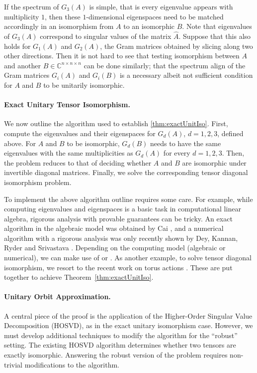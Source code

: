 \documentclass[11pt]{article}
\numberwithin{equation}{section}
\theoremstyle{remark}
\newcommand{\CC}{\mathbb{C}}
\begin{document}
If the spectrum of $G_3(A)$ is simple, that is every eigenvalue appears with multiplicity $1$, then these $1$-dimensional eigenspaces need to be matched accordingly in an isomorphism from $A$ to an isomorphic $B$. Note that eigenvalues of $G_3(A)$ correspond to singular values of the matrix $\hat{A}$. Suppose that this also holds for $G_1(A)$ and $G_2(A)$, the Gram matrices obtained by slicing along two other directions. Then it is not hard to see that testing isomorphism between $A$ and another $B\in \CC^{n\times n\times n}$ can be done similarly; that the spectrum align of the Gram matrices $G_i(A)$ and $G_i(B)$ is a necessary albeit not sufficient condition for $A$ and $B$ to be unitarily isomorphic.

\paragraph{Exact Unitary Tensor Isomorphism.}
We now outline the algorithm used to establish \cref{thm:exactUnitIso}. First, compute the eigenvalues and their eigenspaces for $G_{d}(A)$, $d=1, 2, 3$, defined above. For $A$ and $B$ to be isomorphic, $G_{d}(B)$ needs to have the same eigenvalues with the same multiplicities as $G_{d}(A)$ for every $d=1, 2, 3$. Then, the problem reduces to that of deciding whether $A$ and $B$ are isomorphic under invertible diagonal matrices. Finally, we solve the corresponding tensor diagonal isomorphism problem.

To implement the above algorithm outline requires some care. For example, while computing eigenvalues and eigenspaces is a basic task in computational linear algebra, rigorous analysis with provable guarantees can be tricky. An exact algorithm in the algebraic model was obtained by Cai \cite{cai1994computing}, and a numerical algorithm with a rigorous analysis was only recently shown by Dey, Kannan, Ryder and Srivastava \cite{dey2023bit}. Depending on the computing model (algebraic or numerical), we can make use of \cite{cai1994computing} or \cite{dey2023bit}. As another example, to solve tensor diagonal isomorphism, we resort to the recent work on torus actions \cite{burgisser_et_alCCC.2021.32}. These are put together to achieve Theorem~\ref{thm:exactUnitIso}.

\paragraph{Unitary Orbit Approximation.}
A central piece of the proof is the application of the Higher-Order Singular Value Decomposition (HOSVD), as in the exact unitary isomorphism case. However, we must develop additional techniques to modify the algorithm for the ``robust'' setting. The existing HOSVD algorithm determines whether two tensors are exactly isomorphic. Answering the robust version of the problem requires non-trivial modifications to the algorithm.
\end{document}

